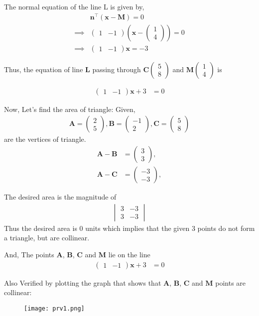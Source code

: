 \documentclass[journal,12pt,twocolumn]{IEEEtran}
\let\vec\mathbf
\newcommand{\mydet}[1]{\ensuremath{\begin{vmatrix}#1\end{vmatrix}}}
\newcommand{\myvec}[1]{\ensuremath{\begin{pmatrix}#1\end{pmatrix}}}
\providecommand{\brak}[1]{\ensuremath{\left(#1\right)}}
\begin{document}
    The normal equation of the line L is given by, 
    \begin{align}
	    &\vec{n}^{\top}\brak{\vec{x} - \vec{M}} = 0\\
	    \implies &\myvec{1 & -1}\brak{\vec{x} - \myvec{1 \\ 4}}= 0\\
	    \implies &\myvec{1 & -1}\vec{x} = -3
    \end{align}
    
    Thus, the equation of line $\vec{L}$ passing through  $\vec{C}\myvec{5\\8}$ and $\vec{M}\myvec{1\\4}$ is 
        
    \begin{align}
          \myvec{1 & - 1}\vec{x} + 3 &= 0
    \end{align}
      
    Now, Let's find the area of triangle:
    Given, 
    \begin{align}
		\vec{A} = \myvec{2 \\ 5} ,
		\vec{B} = \myvec{-1 \\ 2},
		\vec{C} = \myvec{5 \\ 8}
	\end{align}
	are the vertices of triangle.
	\begin{align}
	\vec{A}-\vec{B} &= \myvec{3 \\3},\\
	\vec{A}-\vec{C} &= \myvec{-3 \\-3},
	\end{align}
	
	The desired area is  the magnitude of 
    \begin{align}
     \mydet{3 & -3\\3 & -3} 
    \end{align}
    Thus the desired area is 0 units which implies that the given 3 points do not form a triangle, but are collinear.
    
    And, The points $\vec{A}$, $\vec{B}$, $\vec{C}$ and $\vec{M}$ lie on the line 
    \begin{align}
          \myvec{1 & - 1}\vec{x} + 3 &= 0
    \end{align}
    
    Also Verified by plotting the graph that shows that $\vec{A}$, $\vec{B}$, $\vec{C}$ and $\vec{M}$ points are collinear:

  	\begin{figure}[!ht]
		\centering
		\texttt{[image: prv1.png]}
	\end{figure}
	
\end{document}
